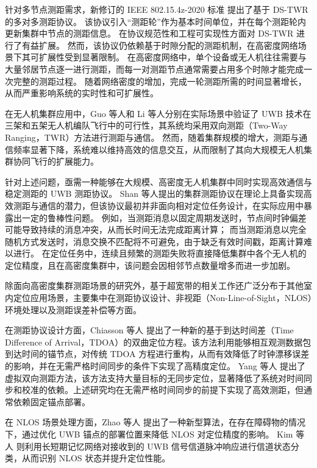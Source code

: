 针对多节点测距需求，新修订的 IEEE 802.15.4z-2020 标准\cite{9179124} 提出了基于 DS-TWR 的多对多测距协议。
该协议引入“测距轮”作为基本时间单位，并在每个测距轮内更新集群中节点的测距信息。
在协议规范性和工程可实现性方面对 DS-TWR 进行了有益扩展。
然而，该协议仍依赖基于时隙分配的测距机制，在高密度网络场景下其可扩展性受到显著限制。
在高密度网络中，单个设备或无人机往往需要与大量邻居节点逐一进行测距，而每一对测距节点通常需要占用多个时隙才能完成一次完整的测距过程。
随着网络密度的增加，完成一轮测距所需的时间显著增长，从而严重影响系统的实时性和可扩展性。

在无人机集群应用中，Guo 等人\cite{guo2017ultra}和 Li 等人\cite{li2020autonomous}分别在实际场景中验证了 UWB 技术在三架和五架无人机编队飞行中的可行性，其系统均采用双向测距（Two-Way Ranging，TWR）方法进行测距与通信。
然而，随着集群规模的增大，测距与通信频率显著下降，系统难以维持高效的信息交互，从而限制了其向大规模无人机集群协同飞行的扩展能力。

针对上述问题，亟需一种能够在大规模、高密度无人机集群中同时实现高效通信与稳定测距的 UWB 测距协议。
Shan 等人\cite{shan2022ultra,shan2021ultra}提出的集群测距协议在理论上具备实现高效测距与通信的潜力，但该协议最初并非面向相对定位任务设计，在实际应用中暴露出一定的鲁棒性问题。
例如，当测距消息以固定周期发送时，节点间时钟偏差可能导致持续的消息冲突，从而长时间无法完成距离计算；
而当测距消息以完全随机方式发送时，消息交换不匹配将不可避免，由于缺乏有效时间戳，距离计算难以进行。
在定位任务中，连续且频繁的测距失败将直接降低集群中各个无人机的定位精度，且在高密度集群中，该问题会因相邻节点数量增多而进一步加剧。


除面向高密度集群测距场景的研究外，基于超宽带的相关工作还广泛分布于其他室内定位应用场景，主要集中在测距协议设计、非视距（Non-Line-of-Sight，NLOS）环境处理以及测距误差补偿等方面。


在测距协议设计方面，Chiasson 等人 \cite{chiasson2023asynchronous} 提出了一种新的基于到达时间差（Time Difference of Arrival，TDOA）的双曲定位方程。该方法利用能够相互观测数据包到达时间的锚节点，对传统 TDOA 方程进行重构，从而有效降低了时钟漂移误差的影响，并在无需严格时间同步的条件下实现了高精度定位。
Yang 等人 \cite{yang2022vuloc}提出了虚拟双向测距方法，该方法支持大量目标的无同步定位，显著降低了系统对时间同步和校准的依赖。上述研究均在无需严格时间同步的前提下实现了高效测距，但通常依赖固定锚点部署。

在 NLOS 场景处理方面，Zhao 等人 \cite{zhao2022finding} 提出了一种新型算法，在存在障碍物的情况下，通过优化 UWB 锚点的部署位置来降低 NLOS 对定位精度的影响。
Kim 等人 \cite{kim2022uwb} 则利用长短期记忆网络对接收到的 UWB 信号信道脉冲响应进行信道状态分类，从而识别 NLOS 状态并提升定位性能。

